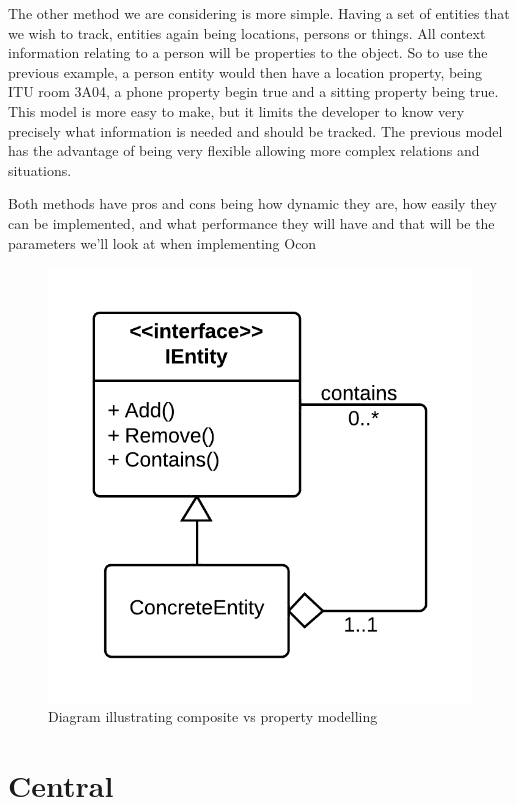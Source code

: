 \documentclass[../report.tex]{subfiles}
\begin{document}
The other method we are considering is more simple. Having a set of entities that we wish to track, entities again being locations, persons or things. All context information relating to a person will be properties to the object. So to use the previous example, a person entity would then have a location property, being ITU room 3A04, a phone property begin true and a sitting property being true. This model is more easy to make, but it limits the developer to know very precisely what information is needed and should be tracked. The previous model has the advantage of being very flexible allowing more complex relations and situations. 

Both methods have pros and cons being how dynamic they are, how easily they can be implemented, and what performance they will have and that will be the parameters we'll look at when implementing Ocon 

\begin{figure}[h]
\centering
\includegraphics[scale=0.2]{composite.png}
\caption{Diagram illustrating composite vs property modelling}
\label{fig:composite}
\end{figure}


\section{Central}
\end{document}
